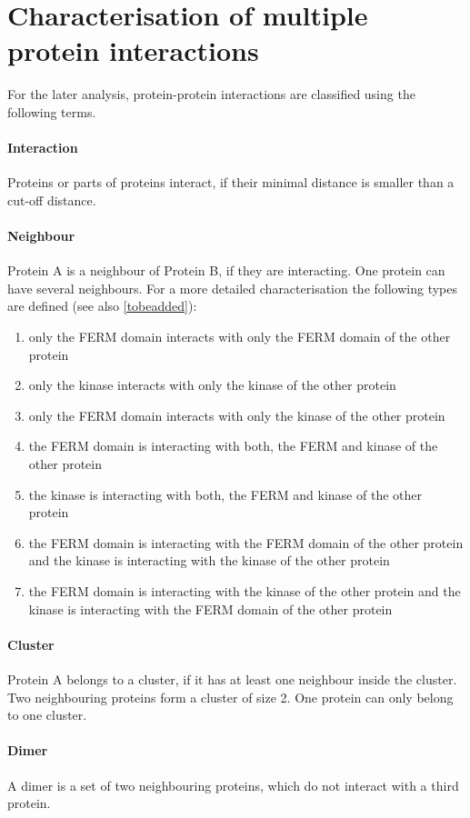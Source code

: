 \section{Characterisation of multiple protein interactions}
For the later analysis, protein-protein interactions are classified using the following terms.
\paragraph{Interaction} Proteins or parts of proteins interact, if their minimal distance is smaller than a cut-off distance.
\paragraph{Neighbour} Protein A is a neighbour of Protein B, if they are interacting. One protein can have several neighbours. For a more detailed characterisation the following types are defined (see also \autoref{tobeadded}):
\begin{enumerate}[label={type \theenumi:}, leftmargin=*]
	\item only the FERM domain interacts with only the FERM domain of the other protein
	\item only the kinase interacts with only the kinase of the other protein
	\item only the FERM domain interacts with only the kinase of the other protein
	\item the FERM domain is interacting with both, the FERM and kinase of the other protein
	\item the kinase is interacting with both, the FERM and kinase of the other protein
	\item the FERM domain is interacting with the FERM domain of the other protein and the kinase is interacting with the kinase of the other protein
	\item the FERM domain is interacting with the kinase of the other protein and the kinase is interacting with the FERM domain of the other protein
\end{enumerate}
\paragraph{Cluster} Protein A belongs to a cluster, if it has at least one neighbour inside the cluster. Two neighbouring proteins form a cluster of size 2. One protein can only belong to one cluster.
\paragraph{Dimer} A dimer is a set of two neighbouring proteins, which do not interact with a third protein.